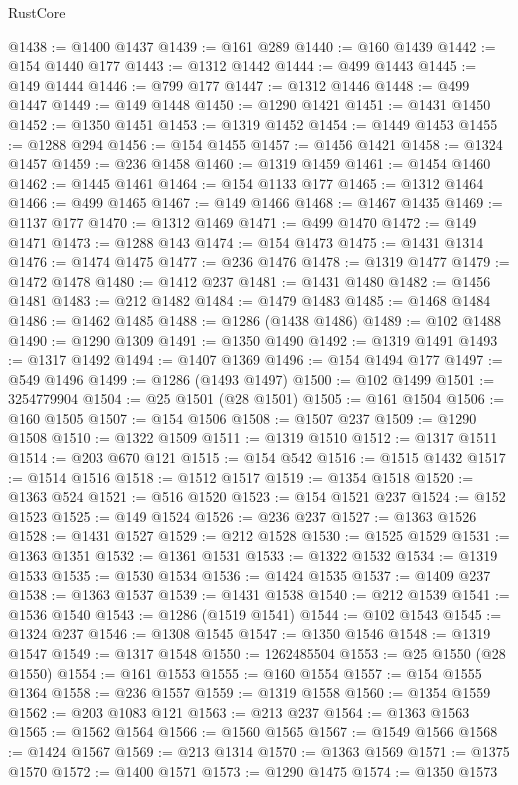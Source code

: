 \begin{lexlean}{RustCore}
\begin{coremodule}
@1438 := @1400 @1437
@1439 := @161 @289
@1440 := @160 @1439
@1442 := @154 @1440 @177
@1443 := @1312 @1442
@1444 := @499 @1443
@1445 := @149 @1444
@1446 := @799 @177
@1447 := @1312 @1446
@1448 := @499 @1447
@1449 := @149 @1448
@1450 := @1290 @1421
@1451 := @1431 @1450
@1452 := @1350 @1451
@1453 := @1319 @1452
@1454 := @1449 @1453
@1455 := @1288 @294
@1456 := @154 @1455
@1457 := @1456 @1421
@1458 := @1324 @1457
@1459 := @236 @1458
@1460 := @1319 @1459
@1461 := @1454 @1460
@1462 := @1445 @1461
@1464 := @154 @1133 @177
@1465 := @1312 @1464
@1466 := @499 @1465
@1467 := @149 @1466
@1468 := @1467 @1435
@1469 := @1137 @177
@1470 := @1312 @1469
@1471 := @499 @1470
@1472 := @149 @1471
@1473 := @1288 @143
@1474 := @154 @1473
@1475 := @1431 @1314
@1476 := @1474 @1475
@1477 := @236 @1476
@1478 := @1319 @1477
@1479 := @1472 @1478
@1480 := @1412 @237
@1481 := @1431 @1480
@1482 := @1456 @1481
@1483 := @212 @1482
@1484 := @1479 @1483
@1485 := @1468 @1484
@1486 := @1462 @1485
@1488 := @1286 (@1438 @1486)
@1489 := @102 @1488
@1490 := @1290 @1309
@1491 := @1350 @1490
@1492 := @1319 @1491
@1493 := @1317 @1492
@1494 := @1407 @1369
@1496 := @154 @1494 @177
@1497 := @549 @1496
@1499 := @1286 (@1493 @1497)
@1500 := @102 @1499
@1501 := 3254779904
@1504 := @25 @1501 (@28 @1501)
@1505 := @161 @1504
@1506 := @160 @1505
@1507 := @154 @1506
@1508 := @1507 @237
@1509 := @1290 @1508
@1510 := @1322 @1509
@1511 := @1319 @1510
@1512 := @1317 @1511
@1514 := @203 @670 @121
@1515 := @154 @542
@1516 := @1515 @1432
@1517 := @1514 @1516
@1518 := @1512 @1517
@1519 := @1354 @1518
@1520 := @1363 @524
@1521 := @516 @1520
@1523 := @154 @1521 @237
@1524 := @152 @1523
@1525 := @149 @1524
@1526 := @236 @237
@1527 := @1363 @1526
@1528 := @1431 @1527
@1529 := @212 @1528
@1530 := @1525 @1529
@1531 := @1363 @1351
@1532 := @1361 @1531
@1533 := @1322 @1532
@1534 := @1319 @1533
@1535 := @1530 @1534
@1536 := @1424 @1535
@1537 := @1409 @237
@1538 := @1363 @1537
@1539 := @1431 @1538
@1540 := @212 @1539
@1541 := @1536 @1540
@1543 := @1286 (@1519 @1541)
@1544 := @102 @1543
@1545 := @1324 @237
@1546 := @1308 @1545
@1547 := @1350 @1546
@1548 := @1319 @1547
@1549 := @1317 @1548
@1550 := 1262485504
@1553 := @25 @1550 (@28 @1550)
@1554 := @161 @1553
@1555 := @160 @1554
@1557 := @154 @1555 @1364
@1558 := @236 @1557
@1559 := @1319 @1558
@1560 := @1354 @1559
@1562 := @203 @1083 @121
@1563 := @213 @237
@1564 := @1363 @1563
@1565 := @1562 @1564
@1566 := @1560 @1565
@1567 := @1549 @1566
@1568 := @1424 @1567
@1569 := @213 @1314
@1570 := @1363 @1569
@1571 := @1375 @1570
@1572 := @1400 @1571
@1573 := @1290 @1475
@1574 := @1350 @1573

\end{coremodule}
\end{lexlean}
